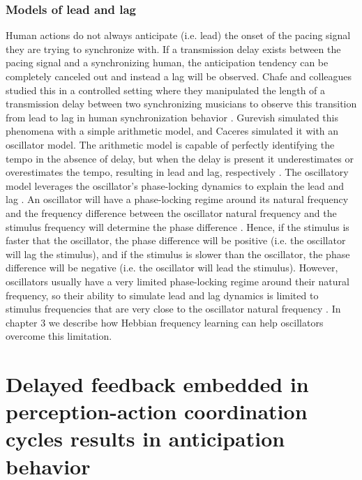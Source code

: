 \documentclass{report}
\begin{document}
\subsection{Models of lead and lag} 
Human actions do not always anticipate (i.e. lead) the onset of the pacing signal they are trying to synchronize with. If a transmission delay exists between the pacing signal and a synchronizing human, the anticipation tendency can be completely canceled out and instead a lag will be observed. Chafe and colleagues studied this in a controlled setting where they manipulated the length of a transmission delay between two synchronizing musicians to observe this transition from lead to lag in human synchronization behavior \cite{chafe2010effect}. Gurevish \cite{gurevish2004simulation} simulated this phenomena with a simple arithmetic model, and Caceres \cite{caceres2013synchronization} simulated it with an oscillator model. The arithmetic model is capable of perfectly identifying the tempo in the absence of delay, but when the delay is present it underestimates or overestimates the tempo, resulting in lead and lag, respectively \cite{gurevish2004simulation}. The oscillatory model leverages the oscillator's phase-locking dynamics to explain the lead and lag \cite{caceres2013synchronization}. An oscillator will have a phase-locking regime around its natural frequency and the frequency difference between the oscillator natural frequency and the stimulus frequency will determine the phase difference \cite{kim2015signal}. Hence, if the stimulus is faster that the oscillator, the phase difference will be positive (i.e. the oscillator will lag the stimulus), and if the stimulus is slower than the oscillator, the phase difference will be negative (i.e. the oscillator will lead the stimulus). However, oscillators usually have a very limited phase-locking regime around their natural frequency, so their ability to simulate lead and lag dynamics is limited to stimulus frequencies that are very close to the oscillator natural frequency \cite{kim2015signal}. In chapter 3 we describe how Hebbian frequency learning can help oscillators overcome this limitation. 


\chapter{Delayed feedback embedded in perception-action coordination cycles results in anticipation behavior}
\end{document}
